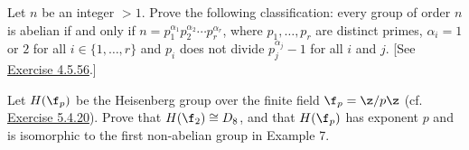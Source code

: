 \begin{exercise}\label{ex5.5.24}
    Let $n$ be an integer $> 1$. Prove the following classification: every group of order $n$ is abelian if and only if $n = p_1^{\alpha_1} p_2^{\alpha_2} \cdots p_r^{\alpha_r}$, where $p_1, \ldots, p_r$ are distinct primes, $\alpha_i = 1$ or $2$ for all $i \in \{1, \ldots, r\}$ and $p_i$ does not divide $p_j^{\alpha_j} - 1$ for all $i$ and $j$. [See \hyperref[ex4.5.56]{Exercise 4.5.56}.]
\end{exercise}

\begin{exercise}\label{ex5.5.25}
    Let $H(\f_p)$ be the Heisenberg group over the finite field $\f_p = \z/p\z$ (cf. \hyperref[ex5.4.20]{Exercise 5.4.20}). Prove that $H(\f_2) \cong D_8$, and that $H(\f_p)$ has exponent $p$ and is isomorphic to the first non-abelian group in Example 7.
\end{exercise}